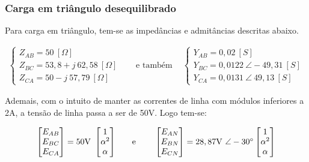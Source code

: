 \documentclass[a4paper,12pt,oneside,openany,table,xcdraw]{article}
\begin{document}
\subsubsection{Carga em triângulo desequilibrado} \label{m3:teoria}
Para carga em triângulo, tem-se as impedâncias e admitâncias descritas abaixo.

\vspace{-0.5cm}
\begin{equation*}
\begin{aligned}
\begin{cases}
Z_{AB} =50\ [ \Omega ]\\
Z_{BC} =53,8+j\ 62,58\ [ \Omega ]\\
Z_{CA} =50-j\ 57,79\ [ \Omega ]
\end{cases} & \quad \text{e também} \quad  & \begin{cases}
Y_{AB} =0,02\ [ S]\\
Y_{BC} =0,0122\ \angle -49,31\ [ S]\\
Y_{CA} =0,0131\ \angle \ 49,13\ [ S]
\end{cases}
\end{aligned}
\end{equation*}
\vspace{0.2cm}

Ademais, com o intuito de manter as correntes de linha com módulos inferiores a 2A, a tensão de linha passa a ser de 50V. Logo tem-se:


\vspace{-0.4cm}
\begin{equation*}
\begin{array}{ c c c }
\mathrm{\begin{bmatrix}
E_{AB}\\
E_{BC}\\
E_{CA}
\end{bmatrix} =50V\ \begin{bmatrix}
1\\
\alpha ^{2}\\
\alpha 
\end{bmatrix}} & \quad \text{e} \quad \  & \mathrm{\begin{bmatrix}
E_{AN}\\
E_{BN}\\
E_{CN}
\end{bmatrix} =28,87V\ \angle -30^{\circ } \begin{bmatrix}
1\\
\alpha ^{2}\\
\alpha 
\end{bmatrix}}
\end{array}
\end{equation*}
\vspace{0.2cm}
\end{document}
